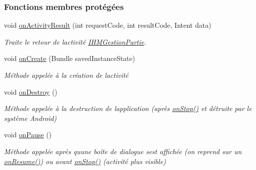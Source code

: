 \subsubsection*{Fonctions membres protégées}
\begin{DoxyCompactItemize}
\item 
void \hyperlink{classcom_1_1example_1_1area_1_1_i_h_m_gestion_rencontre_a2ab13355dbd1751f43ff54c534d0f021}{on\+Activity\+Result} (int request\+Code, int result\+Code, Intent data)
\begin{DoxyCompactList}\small\item\em Traite le retour de l\textquotesingle{}activité \hyperlink{classcom_1_1example_1_1area_1_1_i_h_m_gestion_partie}{I\+H\+M\+Gestion\+Partie}. \end{DoxyCompactList}\item 
void \hyperlink{classcom_1_1example_1_1area_1_1_i_h_m_gestion_rencontre_a233405b574407eda9ba407dd706fef91}{on\+Create} (Bundle saved\+Instance\+State)
\begin{DoxyCompactList}\small\item\em Méthode appelée à la création de l\textquotesingle{}activité \end{DoxyCompactList}\item 
void \hyperlink{classcom_1_1example_1_1area_1_1_i_h_m_gestion_rencontre_a0cee3ae4aa9559d72f43aaa62f4ebe75}{on\+Destroy} ()
\begin{DoxyCompactList}\small\item\em Méthode appelée à la destruction de l\textquotesingle{}application (après \hyperlink{classcom_1_1example_1_1area_1_1_i_h_m_gestion_rencontre_abfee40a2616713d70c0245ae72c6d794}{on\+Stop()} et détruite par le système Android) \end{DoxyCompactList}\item 
void \hyperlink{classcom_1_1example_1_1area_1_1_i_h_m_gestion_rencontre_a390adc8e9ec98d7147957ce8d9e1c071}{on\+Pause} ()
\begin{DoxyCompactList}\small\item\em Méthode appelée après qu\textquotesingle{}une boîte de dialogue s\textquotesingle{}est affichée (on reprend sur un \hyperlink{classcom_1_1example_1_1area_1_1_i_h_m_gestion_rencontre_ad8a4a274c61458fe25a48ccba0d846e7}{on\+Resume()}) ou avant \hyperlink{classcom_1_1example_1_1area_1_1_i_h_m_gestion_rencontre_abfee40a2616713d70c0245ae72c6d794}{on\+Stop()} (activité plus visible) \end{DoxyCompactList}\item 

\end{DoxyCompactItemize}
